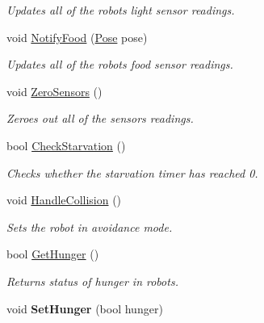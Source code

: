 \begin{DoxyCompactItemize}
\begin{DoxyCompactList}\small\item\em Updates all of the robot\textquotesingle{}s light sensor readings. \end{DoxyCompactList}\item 
void \hyperlink{classRobot_a76ca6cd4a97bc6dd5f7c07afb3068f38}{Notify\+Food} (\hyperlink{structPose}{Pose} pose)\hypertarget{classRobot_a76ca6cd4a97bc6dd5f7c07afb3068f38}{}\label{classRobot_a76ca6cd4a97bc6dd5f7c07afb3068f38}

\begin{DoxyCompactList}\small\item\em Updates all of the robot\textquotesingle{}s food sensor readings. \end{DoxyCompactList}\item 
void \hyperlink{classRobot_a47dc50d25073c3e20c9e1dcc8b907c91}{Zero\+Sensors} ()\hypertarget{classRobot_a47dc50d25073c3e20c9e1dcc8b907c91}{}\label{classRobot_a47dc50d25073c3e20c9e1dcc8b907c91}

\begin{DoxyCompactList}\small\item\em Zeroes out all of the sensor\textquotesingle{}s readings. \end{DoxyCompactList}\item 
bool \hyperlink{classRobot_a1ba35a22382e6ea7884877208614f2fe}{Check\+Starvation} ()
\begin{DoxyCompactList}\small\item\em Checks whether the starvation timer has reached 0. \end{DoxyCompactList}\item 
void \hyperlink{classRobot_a30eab32ba9554890537df5605ed290ff}{Handle\+Collision} ()\hypertarget{classRobot_a30eab32ba9554890537df5605ed290ff}{}\label{classRobot_a30eab32ba9554890537df5605ed290ff}

\begin{DoxyCompactList}\small\item\em Sets the robot in avoidance mode. \end{DoxyCompactList}\item 
bool \hyperlink{classRobot_a2eff92357f02b67c003f114bc3daf8d6}{Get\+Hunger} ()\hypertarget{classRobot_a2eff92357f02b67c003f114bc3daf8d6}{}\label{classRobot_a2eff92357f02b67c003f114bc3daf8d6}

\begin{DoxyCompactList}\small\item\em Returns status of hunger in robots. \end{DoxyCompactList}\item 
void {\bfseries Set\+Hunger} (bool hunger)\hypertarget{classRobot_aec65ca60fc788892cbf4e843e96ffa9a}{}\label{classRobot_aec65ca60fc788892cbf4e843e96ffa9a}


\end{DoxyCompactItemize}
